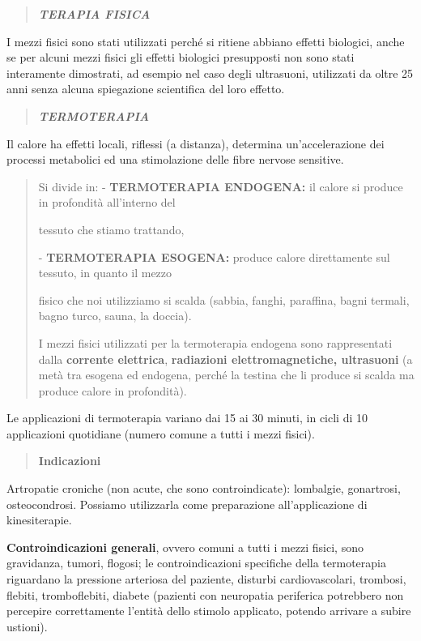 \documentclass[]{article}
\date{}
\begin{document}
\begin{quote}
\textbf{\emph{TERAPIA FISICA}}
\end{quote}

I mezzi fisici sono stati utilizzati perché si ritiene abbiano effetti
biologici, anche se per alcuni mezzi fisici gli effetti biologici
presupposti non sono stati interamente dimostrati, ad esempio nel caso
degli ultrasuoni, utilizzati da oltre 25 anni senza alcuna spiegazione
scientifica del loro effetto.

\begin{quote}
\textbf{\emph{TERMOTERAPIA}}
\end{quote}

Il calore ha effetti locali, riflessi (a distanza), determina
un'accelerazione dei processi metabolici ed una stimolazione delle fibre
nervose sensitive.

\begin{quote}
Si divide in: - \textbf{TERMOTERAPIA ENDOGENA:} il calore si produce in
profondità all'interno del

tessuto che stiamo trattando,

- \textbf{TERMOTERAPIA ESOGENA:} produce calore direttamente sul
tessuto, in quanto il mezzo

fisico che noi utilizziamo si scalda (sabbia, fanghi, paraffina, bagni
termali, bagno turco, sauna, la doccia).

I mezzi fisici utilizzati per la termoterapia endogena sono
rappresentati dalla \textbf{corrente elettrica}, \textbf{radiazioni
elettromagnetiche, ultrasuoni} (a metà tra esogena ed endogena, perché
la testina che li produce si scalda ma produce calore in profondità).
\end{quote}

Le applicazioni di termoterapia variano dai 15 ai 30 minuti, in cicli di
10 applicazioni quotidiane (numero comune a tutti i mezzi fisici).

\begin{quote}
\textbf{Indicazioni}
\end{quote}

Artropatie croniche (non acute, che sono controindicate): lombalgie,
gonartrosi, osteocondrosi. Possiamo utilizzarla come preparazione
all'applicazione di kinesiterapie.

\textbf{Controindicazioni generali}, ovvero comuni a tutti i mezzi
fisici, sono gravidanza, tumori, flogosi; le controindicazioni
specifiche della termoterapia riguardano la pressione arteriosa del
paziente, disturbi cardiovascolari, trombosi, flebiti, tromboflebiti,
diabete (pazienti con neuropatia periferica potrebbero non percepire
correttamente l'entità dello stimolo applicato, potendo arrivare a
subire ustioni).
\end{document}

